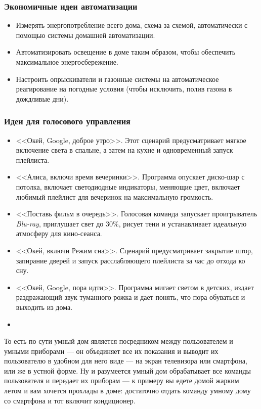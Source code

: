 \documentclass[a4paper,14pt]{extarticle}
\begin{document}
\subsubsection*{Экономичные идеи автоматизации}
\begin{itemize}
	\item Измерять энергопотребление всего дома, схема за схемой, автоматически с помощью системы домашней автоматизации.
	\item Автоматизировать освещение в доме таким образом, чтобы обеспечить максимальное энергосбережение.
	\item Настроить опрыскиватели и газонные системы на автоматическое реагирование на погодные условия (чтобы исключить, полив газона в дождливые дни).
\end{itemize}
\subsubsection*{Идеи для голосового управления}
\begin{itemize}
\item  <<Окей, Google, доброе утро>>. Этот сценарий предусматривает мягкое включение света в спальне, а затем на кухне и одновременный запуск плейлиста.
\item <<Алиса, включи время вечеринки>>. Программа опускает диско-шар с потолка, включает светодиодные индикаторы, меняющие цвет, включает любимый плейлист для вечеринок на максимальную громкость.
\item <<Поставь фильм в очередь>>. Голосовая команда запускает проигрыватель \textit{Blu-ray}, приглушает свет до 30\%, рисует тени и устанавливает идеальную атмосферу для кино-сеанса.
\item  <<Окей, включи Режим сна>>. Сценарий предусматривает закрытие штор, запирание дверей и запуск расслабляющего плейлиста за час до отхода ко сну.
\item  <<Окей, Google, пора идти>>. Программа мигает светом в детских, издает раздражающий звук туманного рожка и дает понять, что пора обуваться и выходить из дома.
\item 
\end{itemize}


То есть по сути умный дом является посредником между пользователем и умными приборами --- он объединяет все их показания и выводит их пользователю в удобном для него виде --- на экран телевизора или смартфона, или же в устной форме. Ну и разумеется умный дом обрабатывает все команды пользователя и передает их приборам --- к примеру вы едете домой жарким летом и вам хочется прохлады в доме: достаточно отдать команду умному дому со смартфона и тот включит кондиционер.
\end{document}
